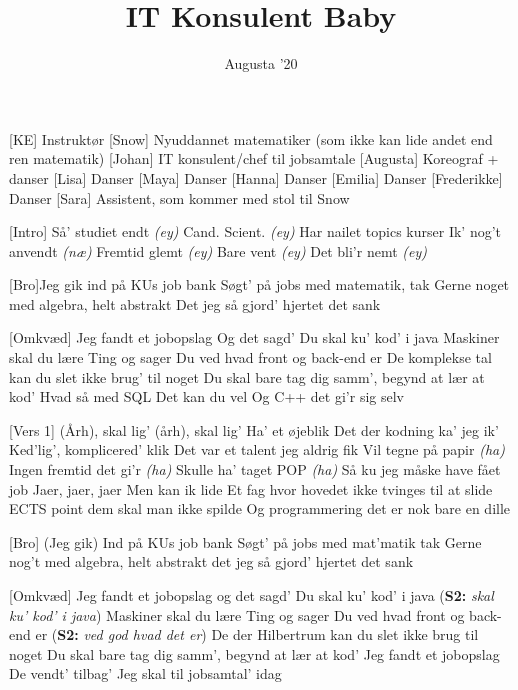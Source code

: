 \documentclass[a4paper,11pt]{article}
\title{IT Konsulent Baby}
\author{Augusta '20}
\begin{document}
\maketitle

\begin{roles}
[KE] Instruktør
[Snow] Nyuddannet matematiker (som ikke kan lide andet end ren matematik)
[Johan] IT konsulent/chef til jobsamtale
[Augusta] Koreograf + danser
[Lisa] Danser
[Maya] Danser
[Hanna] Danser
[Emilia] Danser
[Frederikke] Danser
[Sara] Assistent, som kommer med stol til Snow
\end{roles}

\begin{song}
[Intro] Så' studiet endt \textit{(ey)} 
Cand. Scient. \textit{(ey)} 
Har nailet topics kurser 
Ik' nog't anvendt \textit{(næ)}
Fremtid glemt \textit{(ey)}
Bare vent \textit{(ey)} 
Det bli'r nemt \textit{(ey)} 


[Bro]Jeg gik ind på KUs job bank 
Søgt’ på jobs med matematik, tak
Gerne noget med algebra, helt abstrakt 
Det jeg så gjord’ hjertet det sank 


[Omkvæd] Jeg fandt et jobopslag 
Og det sagd’ 
Du skal ku’ kod’ i java
Maskiner skal du lære
Ting og sager 
Du ved hvad front og back-end er 
De komplekse tal kan du slet ikke brug' til noget 
Du skal bare tag dig samm’, begynd at lær at kod’
Hvad så med SQL
Det kan du vel
Og C++ det gi’r sig selv

[Vers 1] (Årh), skal lig’ (årh), skal lig’ 
Ha’ et øjeblik
Det der kodning ka' jeg ik' 
Ked'lig', komplicered' klik 
Det var et talent jeg aldrig fik
Vil tegne på papir \textit{(ha)}
Ingen fremtid det gi’r \textit{(ha)}
Skulle ha' taget POP \textit{(ha)}
Så ku jeg måske have fået job
Jaer, jaer, jaer
Men kan ik lide 
Et fag hvor hovedet ikke tvinges til at slide
ECTS point dem skal man ikke spilde 
Og programmering det er nok bare en dille 

[Bro] (Jeg gik) Ind på KUs job bank 
Søgt’ på jobs med mat’matik tak
Gerne nog’t med algebra, helt abstrakt 
det jeg så gjord’ hjertet det sank 


[Omkvæd] 
Jeg fandt et jobopslag 
og det sagd’ 
Du skal ku’ kod’ i java (\textbf{S2:} \textit{skal ku' kod' i java})
Maskiner skal du lære
Ting og sager
Du ved hvad front og back-end er (\textbf{S2:} \textit{ved god hvad det er})
De der Hilbertrum kan du slet ikke brug til noget 
Du skal bare tag dig samm’, begynd at lær at kod’ 
Jeg fandt et jobopslag
De vendt’ tilbag’
Jeg skal til jobsamtal’ idag


\end{song}
\end{document}
